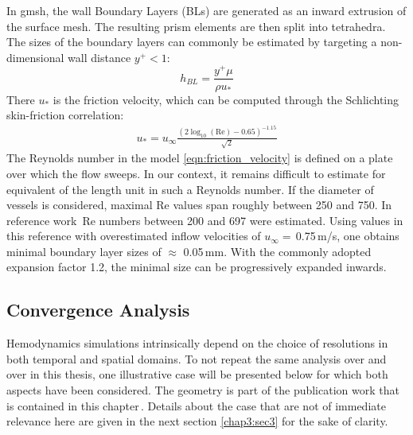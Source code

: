 In gmsh, the wall Boundary Layers (BLs) are generated as an inward extrusion of the surface mesh. The resulting prism elements are then split into tetrahedra. The sizes of the boundary layers can commonly be estimated by targeting a non-dimensional wall distance $y^+ < 1$:
\begin{equation*}
	h_{BL} = \frac{y^+\mu}{\rho u_*}
\end{equation*}
There $u_*$ is the friction velocity, which can be computed through the Schlichting skin-friction correlation:
\begin{equation}
	\begin{split}
		u_* = u_\infty \frac{\left(2\log_{10}{(\text{Re})} -0.65\right)^{-1.15} }{\sqrt{2}}
	\end{split}
	\label{eqn:friction_velocity}
\end{equation}
The Reynolds number in the model \autoref{eqn:friction_velocity} is defined on a plate over which the flow sweeps. In our context, it remains difficult to estimate for equivalent of the length unit in such a Reynolds number. If the diameter of vessels is considered, maximal Re values span roughly between 250 and 750. In reference work\,\cite{Jain2016, Valen-Sendstad2011} Re numbers between 200 and 697 were estimated. Using values in this reference with overestimated inflow velocities of $u_{\infty}=$\,0.75\,m/s, one obtains minimal boundary layer sizes of $\approx$ 0.05\,mm. With the commonly adopted expansion factor 1.2, the minimal size can be progressively expanded inwards.

\subsection{Convergence Analysis}
Hemodynamics simulations intrinsically depend on the choice of resolutions in both temporal and spatial domains. To not repeat the same analysis over and over in this thesis, one illustrative case will be presented below for which both aspects have been considered. The geometry is part of the publication work that is contained in this chapter\,\cite{Jeken-Rico2023}. Details about the case that are not of immediate relevance here are given in the next section \autoref{chap3:sec3} for the sake of clarity.\\

